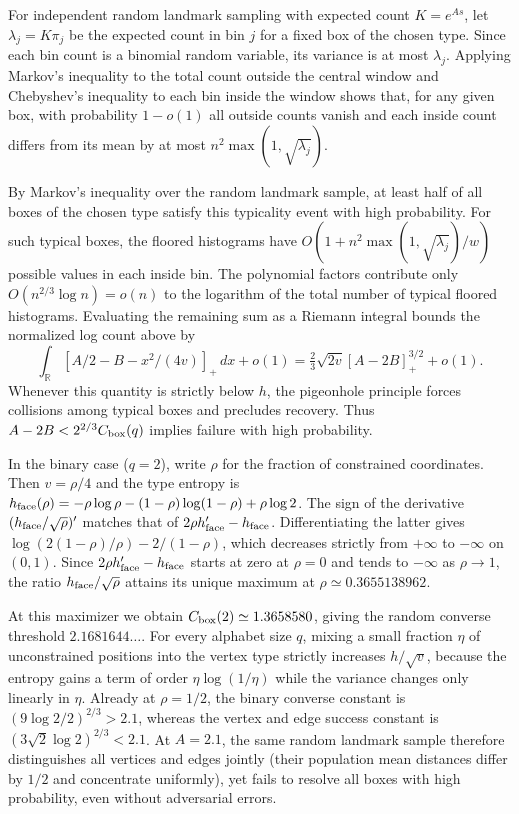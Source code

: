 For independent random landmark sampling with expected count $K=e^{As}$, let $\lambda_j=K\pi_j$ be the expected count in bin $j$ for a fixed box of the chosen type. Since each bin count is a binomial random variable, its variance is at most $\lambda_j$. Applying Markov's inequality to the total count outside the central window and Chebyshev's inequality to each bin inside the window shows that, for any given box, with probability $1-o(1)$ all outside counts vanish and each inside count differs from its mean by at most $n^2\max(1,\sqrt{\lambda_j})$.

By Markov's inequality over the random landmark sample, at least half of all boxes of the chosen type satisfy this typicality event with high probability. For such typical boxes, the floored histograms have $O(1+n^2\max(1,\sqrt{\lambda_j})/w)$ possible values in each inside bin. The polynomial factors contribute only $O(n^{2/3}\log n)=o(n)$ to the logarithm of the total number of typical floored histograms. Evaluating the remaining sum as a Riemann integral bounds the normalized log count above by
\[
 \int_{\mathbb R}[A/2-B-x^2/(4v)]_+\,dx+o(1)
 =\tfrac23\sqrt{2v}[A-2B]_+^{3/2}+o(1).
\]
Whenever this quantity is strictly below $h$, the pigeonhole principle forces collisions among typical boxes and precludes recovery. Thus $A-2B<2^{2/3}C_{\rm box}(q)$ implies failure with high probability.

In the binary case ($q=2$), write $\rho$ for the fraction of constrained coordinates. Then $v=\rho/4$ and the type entropy is $h_{\rm face}(\rho)=-\rho\log\rho-(1-\rho)\log(1-\rho)+\rho\log2$. The sign of the derivative $(h_{\rm face}/\sqrt\rho)'$ matches that of $2\rho h_{\rm face}'-h_{\rm face}$. Differentiating the latter gives $\log(2(1-\rho)/\rho)-2/(1-\rho)$, which decreases strictly from $+\infty$ to $-\infty$ on $(0,1)$. Since $2\rho h_{\rm face}'-h_{\rm face}$ starts at zero at $\rho=0$ and tends to $-\infty$ as $\rho\to1$, the ratio $h_{\rm face}/\sqrt\rho$ attains its unique maximum at $\rho\simeq0.3655138962$.

At this maximizer we obtain $C_{\rm box}(2)\simeq1.3658580$, giving the random converse threshold $2.1681644\ldots$. For every alphabet size $q$, mixing a small fraction $\eta$ of unconstrained positions into the vertex type strictly increases $h/\sqrt v$, because the entropy gains a term of order $\eta\log(1/\eta)$ while the variance changes only linearly in $\eta$. Already at $\rho=1/2$, the binary converse constant is $(9\log2/2)^{2/3}>2.1$, whereas the vertex and edge success constant is $(3\sqrt2\log2)^{2/3}<2.1$. At $A=2.1$, the same random landmark sample therefore distinguishes all vertices and edges jointly (their population mean distances differ by $1/2$ and concentrate uniformly), yet fails to resolve all boxes with high probability, even without adversarial errors.

